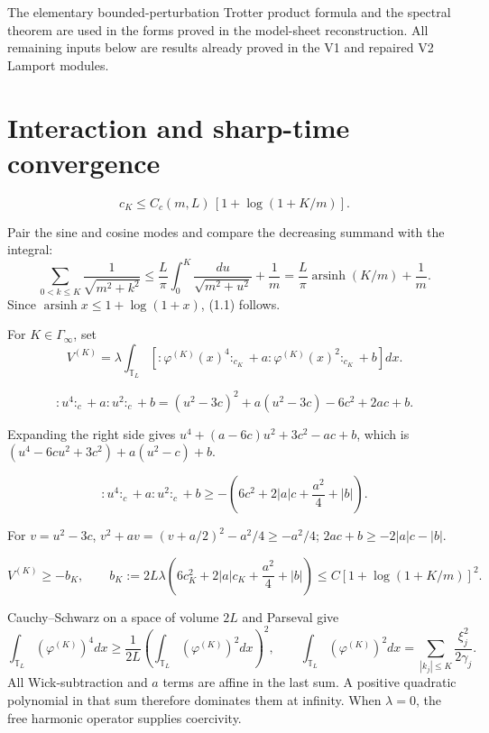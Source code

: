 \documentclass[11pt,a4paper]{article}
\newcommand{\T}{\mathbb T}
\begin{document}
The elementary bounded-perturbation Trotter product formula and the spectral
theorem are used in the forms proved in the model-sheet reconstruction.  All
remaining inputs below are results already proved in the V1 and repaired V2
Lamport modules.

\section{Interaction and sharp-time convergence}


\[
 c_K\le C_c(m,L)\,[1+\log(1+K/m)].\tag{1.1}
\]

\Because Pair the sine and cosine modes and compare the decreasing summand with
the integral:
\[
 \sum_{0<k\le K}\frac1{\sqrt{m^2+k^2}}
 \le \frac L\pi\int_0^K\frac{du}{\sqrt{m^2+u^2}}+\frac1m
 =\frac L\pi\operatorname{arsinh}(K/m)+\frac1m.
\]
Since $\operatorname{arsinh}x\le1+\log(1+x)$, (1.1) follows.

\QedStep


For $K\in\Gamma_\infty$, set
\[
 V^{(K)}=\lambda\int_{\T_L}
 \left[{:}\varphi^{(K)}(x)^4{:}_{c_K}
 +a{:}\varphi^{(K)}(x)^2{:}_{c_K}+b\right]dx.
\tag{1.2}
\]

\[
 {:}u^4{:}_c+a{:}u^2{:}_c+b
 =(u^2-3c)^2+a(u^2-3c)-6c^2+2ac+b.
\tag{1.3}
\]

\Because Expanding the right side gives
$u^4+(a-6c)u^2+3c^2-ac+b$, which is
$(u^4-6cu^2+3c^2)+a(u^2-c)+b$.

\[
 {:}u^4{:}_c+a{:}u^2{:}_c+b
 \ge-\left(6c^2+2|a|c+\frac{a^2}{4}+|b|\right).
\tag{1.4}
\]

\Because For $v=u^2-3c$, $v^2+av=(v+a/2)^2-a^2/4\ge-a^2/4$;
$2ac+b\ge-2|a|c-|b|$.

\[
 V^{(K)}\ge-b_K,\qquad
 b_K:=2L\lambda\left(6c_K^2+2|a|c_K+\frac{a^2}{4}+|b|\right)
 \le C[1+\log(1+K/m)]^2.
\tag{1.5}
\]


\Because Cauchy--Schwarz on a space of volume $2L$ and Parseval give
\[
 \int_{\T_L}(\varphi^{(K)})^4dx
 \ge\frac1{2L}\left(\int_{\T_L}(\varphi^{(K)})^2dx\right)^2,
 \qquad
 \int_{\T_L}(\varphi^{(K)})^2dx
 =\sum_{|k_j|\le K}\frac{\xi_j^2}{2\gamma_j}.
\tag{1.6}
\]
All Wick-subtraction and $a$ terms are affine in the last sum.  A positive
quadratic polynomial in that sum therefore dominates them at infinity.  When
$\lambda=0$, the free harmonic operator supplies coercivity.
\end{document}
